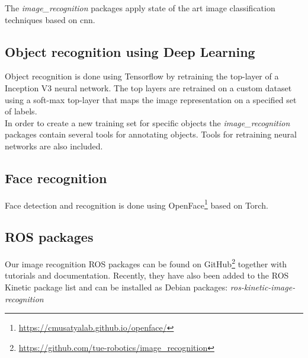 The \emph{image\_recognition} packages apply state of the art image classification techniques based on \acrfull{cnn}.

\subsection{Object recognition using Deep Learning}
Object recognition is done using Tensorflow\texttrademark\hspace{0em} by retraining the top-layer of a Inception V3 neural network. The top layers are retrained on a custom dataset using a soft-max top-layer that maps the image representation on a specified set of labels.
\\
In order to create a new training set for specific objects the \emph{image\_recognition} packages contain several tools for annotating objects. Tools for retraining neural networks are also included.

\subsection{Face recognition}
Face detection and recognition is done using OpenFace\footnote{\url{https://cmusatyalab.github.io/openface/}} based on Torch. 
\subsection{ROS packages}
Our image recognition ROS packages can be found on GitHub\footnote{\url{https://github.com/tue-robotics/image_recognition}} together with tutorials and documentation. 
Recently, they have also been added to the ROS Kinetic package list and can be installed as Debian packages: \emph{ros-kinetic-image-recognition} 